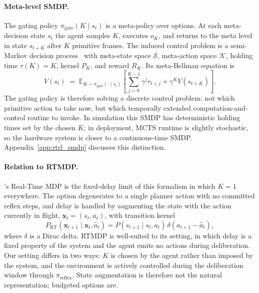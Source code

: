 \documentclass{article}
\newcommand{\Kset}{\mathcal{K}}
\newcommand{\pigate}{\pi_{\mathrm{gate}}}
\begin{document}
\paragraph{Meta-level SMDP.}
The gating policy $\pigate(K \mid s_t)$ is a meta-policy over
options.
At each meta-decision state $s_t$ the agent samples $K$, executes
$o_K$, and returns to the meta level in state $s_{t+K}$ after $K$
primitive frames.
The induced control problem is a semi-Markov decision
process~\citep{sutton1999between,bacon2017optioncritic} with
meta-state space $\mathcal{S}$, meta-action space $\Kset$, holding
time $\tau(K) = K$, kernel $P_K$, and reward $R_K$.
Its meta-Bellman equation is
\begin{equation}
  V(s_t)
  \;=\;
  \mathbb{E}_{K \sim \pigate(\cdot \mid s_t)}\!\left[
    \sum_{j=0}^{K-1} \gamma^j r_{t+j}
    + \gamma^K V(s_{t+K})
  \right].
  \label{eq:smdp}
\end{equation}
The gating policy is therefore solving a discrete control problem:
not which primitive action to take now, but which temporally
extended computation-and-control routine to invoke.
In simulation this SMDP has deterministic holding times set by the
chosen $K$; in deployment, MCTS runtime is slightly stochastic, so
the hardware system is closer to a continuous-time SMDP.
Appendix~\ref{app:rtrl_smdp} discusses this distinction.

\paragraph{Relation to RTMDP.}
\citet{ramstedt2019rtrl}'s Real-Time MDP is the fixed-delay limit of this
formalism in which $K = 1$ everywhere.
The option degenerates to a single planner action with no committed
reflex steps, and delay is handled by augmenting the state with the
action currently in flight, $\mathbf{x}_t = (s_t, a_t)$, with
transition kernel
\begin{equation}
  P_{\mathrm{RT}}(\mathbf{x}_{t+1} \mid \mathbf{x}_t, \hat{a}_t)
  = P(s_{t+1} \mid s_t, a_t)\,\delta(a_{t+1} - \hat{a}_t),
\end{equation}
where $\delta$ is a Dirac delta.
RTMDP is well-suited to its setting, in which delay is a fixed
property of the system and the agent emits no actions during
deliberation.
Our setting differs in two ways: $K$ is chosen by the agent rather
than imposed by the system, and the environment is actively
controlled during the deliberation window through
$\pi_{\mathrm{reflex}}$.
State augmentation is therefore not the natural representation;
budgeted options are.
\end{document}
